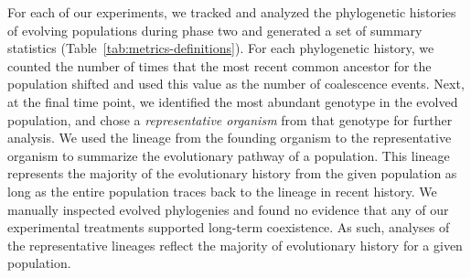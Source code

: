 \begin{raggedbottom}
For each of our experiments, we tracked and analyzed the phylogenetic histories of evolving populations during phase two and generated a set of summary statistics (Table~\ref{tab:metrics-definitions}).
For each phylogenetic history, we counted the number of times that the most recent common ancestor for the population shifted and used this value as the number of coalescence events.
Next, at the final time point, we identified the most abundant genotype in the evolved population, and chose a \textit{representative organism} from that genotype for further analysis.
We used the lineage from the founding organism to the representative organism to summarize the evolutionary pathway of a population. 
This lineage represents the majority of the evolutionary history from the given population as long as the entire population traces back to the lineage in recent history.
We manually inspected evolved phylogenies and found no evidence that any of our experimental treatments supported long-term coexistence.
As such, analyses of the representative lineages reflect the majority of evolutionary history for a given population.



\end{raggedbottom}

